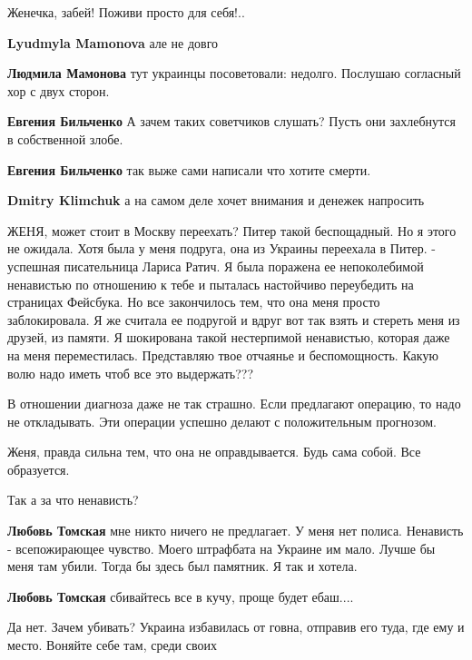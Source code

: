 \begin{itemize}
Женечка, забей! Поживи просто для себя!..

\begin{itemize} %
\textbf{Lyudmyla Mamonova} але не довго

\textbf{Людмила Мамонова} тут украинцы посоветовали: недолго. Послушаю согласный хор с двух сторон.

\textbf{Евгения Бильченко} А зачем таких советчиков слушать? Пусть они захлебнутся в собственной злобе.

\textbf{Евгения Бильченко} так выже сами написали что хотите смерти.

\textbf{Dmitry Klimchuk} а на самом деле хочет внимания и денежек напросить
\end{itemize} %


ЖЕНЯ, может стоит в Москву переехать? Питер такой беспощадный. Но я этого не
ожидала. Хотя была у меня подруга, она из Украины переехала в Питер. - успешная
писательница Лариса Ратич. Я была поражена ее непоколебимой ненавистью по
отношению к тебе и пыталась настойчиво переубедить на страницах Фейсбука. Но
все закончилось тем, что она меня просто заблокировала. Я же считала ее
подругой и вдруг вот так взять и стереть меня из друзей, из памяти. Я
шокирована такой нестерпимой ненавистью, которая даже на меня переместилась.
Представляю твое отчаянье и беспомощность. Какую волю надо иметь чтоб все это
выдержать???

В отношении диагноза даже не так страшно. Если предлагают операцию, то надо не
откладывать. Эти операции успешно делают с положительным прогнозом.

Женя, правда сильна тем, что она не оправдывается. Будь сама собой. Все
образуется.

\begin{itemize} %
Так а за что ненависть?


\textbf{Любовь Томская} мне никто ничего не предлагает. У меня нет полиса. Ненависть - всепожирающее чувство. Моего штрафбата на Украине им мало. Лучше бы меня там убили. Тогда бы здесь был памятник. Я так и хотела.

\textbf{Любовь Томская} сбивайтесь все в кучу, проще будет ебаш....

Да нет. Зачем убивать? Украина избавилась от говна, отправив его туда, где ему и место. Воняйте себе там, среди своих


\end{itemize}
\end{itemize}
